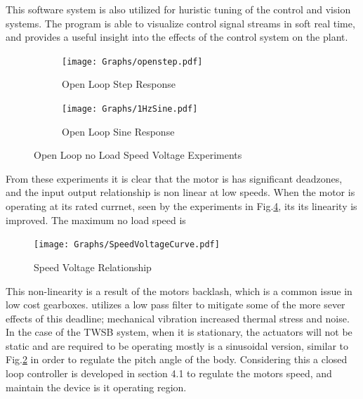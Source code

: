         This software system is also utilized for huristic tuning of the control
        and vision systems. The program is able to visualize control signal streams in soft real time, 
        and provides a useful insight into the effects of the control system on the plant.

        \begin{figure}[H]
            \centering
            \begin{subfigure}[b]{0.45\textwidth}
            \texttt{[image: Graphs/openstep.pdf]}
            \caption{Open Loop Step Response}
            \label{fig:openstep}
            \end{subfigure}
            \hfill
            \begin{subfigure}[b]{0.45\textwidth}
            \texttt{[image: Graphs/1HzSine.pdf]}
            \caption{Open Loop Sine Response}
            \label{fig:opensine}
            \end{subfigure}
            \caption{Open Loop no Load Speed Voltage Experiments}
            \label{fig:openloop}
        \end{figure}


        From these experiments it is clear that the motor is has significant deadzones, 
        and the input output relationship is non linear at low speeds. When the motor is operating at its rated currnet, 
        seen by the experiments in Fig.\ref{fig:speedvolt}, its its linearity is improved. The maximum no load speed is  
        \begin{figure}[H]
            \centering
            \texttt{[image: Graphs/SpeedVoltageCurve.pdf]}
            \caption{Speed Voltage Relationship}
            \label{fig:speedvolt}
        \end{figure}

        This non-linearity is a result of the motors backlash, which is a common issue in low cost gearboxes.
        \cite{grasser2002joe} utilizes a low pass filter to mitigate some of the more sever effects of 
        this deadline; mechanical vibration increased thermal stress and noise. 
        In the case of the TWSB system, when it is stationary, 
        the actuators will not be static and are required to be operating mostly is a sinusoidal version, 
        similar to Fig.\ref{fig:opensine} in order to regulate the pitch angle of the body.
        Considering this a closed loop controller is developed in section 4.1 to regulate the motors speed,
         and maintain the device is it operating region. 
    \pagebreak{}



